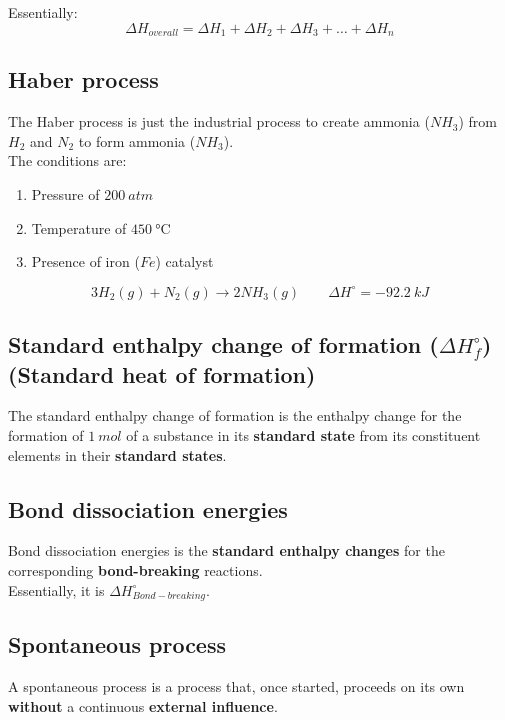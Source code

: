 \documentclass[11pt]{article}
\begin{document}
Essentially:
\[\Delta H_{overall} = \Delta H_{1} + \Delta H_{2} + \Delta H_{3} + \ldots + \Delta H_{n}\]

\newpage

\subsection{Haber process}
\label{sec:org4768217}
The Haber process is just the industrial process to create ammonia (\(NH_3\)) from \(H_2\) and \(N_2\) to form ammonia (\(NH_3\)).
\\[0pt]

The conditions are:
\begin{enumerate}
\item Pressure of \(\qty{200}{\unit{atm}}\)
\item Temperature of \(\qty{450}{\unit{\degreeCelsius}}\)
\item Presence of iron (\(Fe\)) catalyst
\end{enumerate}

\[3H_2 (g) + N_2 (g) \rightarrow 2NH_3 (g) \qquad \Delta H^\circ = -\qty{92.2}{\unit{kJ}}\]

\subsection{Standard enthalpy change of formation (\(\Delta H^\circ_f\)) (Standard heat of formation)}
\label{sec:org7e2580c}
The standard enthalpy change of formation is the enthalpy change for the formation of \(\qty{1}{\unit{mol}}\) of a substance in its \textbf{standard state} from its constituent elements in their \textbf{standard states}.

\subsection{Bond dissociation energies}
\label{sec:orge197ed3}
Bond dissociation energies is the \textbf{standard enthalpy changes} for the corresponding \textbf{bond-breaking} reactions.
\\[0pt]

Essentially, it is \(\Delta H^\circ_{Bond-breaking}\).

\subsection{Spontaneous process}
\label{sec:org95e60e2}
A spontaneous process is a process that, once started, proceeds on its own \textbf{without} a continuous \textbf{external influence}.
\end{document}
